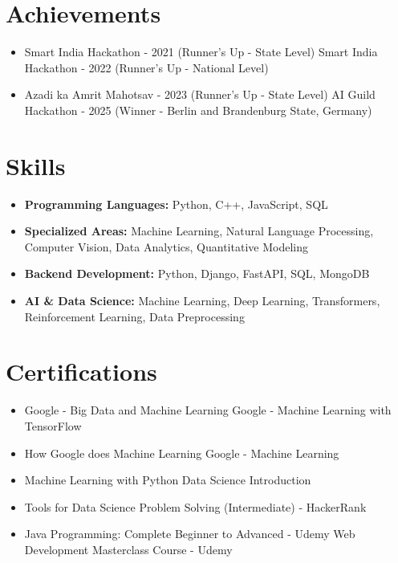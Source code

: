 \documentclass[a4paper,10pt]{article}
\begin{document}
\section*{Achievements}
\begin{itemize}
\item Smart India Hackathon - 2021 (Runner's Up - State Level) \hfill Smart India Hackathon - 2022 (Runner's Up - National Level)
\item Azadi ka Amrit Mahotsav - 2023 (Runner's Up - State Level) \hfill AI Guild Hackathon - 2025 (Winner - Berlin and Brandenburg State, Germany)
\end{itemize}

\section*{Skills}
\begin{itemize}
  \item \textbf{Programming Languages:} Python, C++, JavaScript, SQL
  \item \textbf{Specialized Areas:} Machine Learning, Natural Language Processing, Computer Vision, Data Analytics, Quantitative Modeling
  \item \textbf{Backend Development:} Python, Django, FastAPI, SQL, MongoDB
  \item \textbf{AI \& Data Science:} Machine Learning, Deep Learning, Transformers, Reinforcement Learning, Data Preprocessing
\end{itemize}

\section*{Certifications}
\begin{itemize}
\item Google - Big Data and Machine Learning \hfill Google - Machine Learning with TensorFlow
\item How Google does Machine Learning \hfill Google - Machine Learning
\item Machine Learning with Python \hfill Data Science Introduction
\item Tools for Data Science \hfill Problem Solving (Intermediate) - HackerRank
\item Java Programming: Complete Beginner to Advanced - Udemy \hfill Web Development Masterclass Course - Udemy
\end{itemize}
\end{document}
